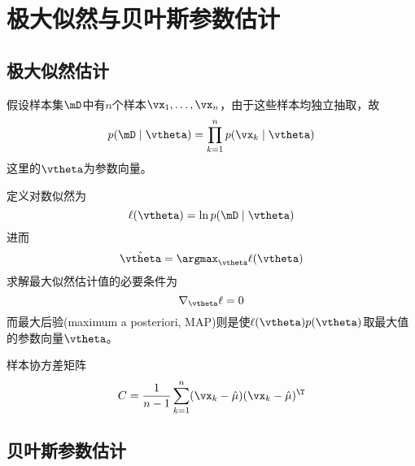 
\section{极大似然与贝叶斯参数估计} %
\subsection{极大似然估计}
假设样本集$\mD$中有$n$个样本$\vx_1,\ldots,\vx_n$，由于这些样本均独立抽取，故
\[p(\mD\mid\vtheta)=\prod_{k=1}^np(\vx_k\mid\vtheta)\]
这里的$\vtheta$为参数向量。

定义对数似然为
\[\ell(\vtheta)=\ln p(\mD\mid\vtheta)\]
进而
\[\hat{\vtheta}=\argmax_\vtheta\ell(\vtheta)\]
求解最大似然估计值的必要条件为
\[\nabla_\vtheta\ell = 0\]
而最大后验(maximum a posteriori, MAP)则是使$\ell(\vtheta)p(\vtheta)$取最大值的参数向量$\vtheta$。

样本协方差矩阵
\[C=\frac{1}{n-1}\sum_{k=1}^n(\vx_k-\hat{\mu})(\vx_k-\hat{\mu})^\T\]

\subsection{贝叶斯参数估计}
